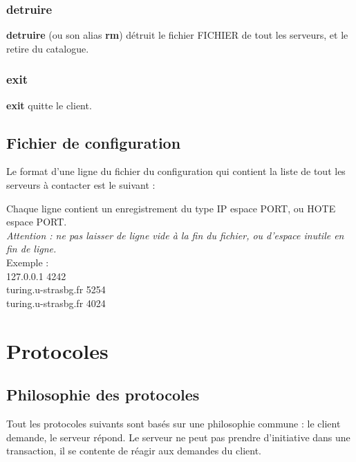 \documentclass[10pt,a4paper]{article}
\begin{document}
\subsubsection{detruire}
\begin{center}
\end{center}
\textbf{detruire} (ou son alias \textbf{rm}) détruit le fichier FICHIER de tout les serveurs, et le retire du catalogue.

\subsubsection{exit}
\begin{center}
\end{center}
\textbf{exit} quitte le client.

\subsection{Fichier de configuration}

Le format d'une ligne du fichier du configuration qui contient la liste de tout les serveurs à contacter est le suivant :
\begin{center}
\end{center}
Chaque ligne contient un enregistrement du type IP espace PORT, ou HOTE espace PORT.\\
\textit{Attention : ne pas laisser de ligne vide à la fin du fichier, ou d'espace inutile en fin de ligne.}\\

Exemple :\\
127.0.0.1 4242\\
turing.u-strasbg.fr 5254\\
turing.u-strasbg.fr 4024\\
\newpage

\section{Protocoles}

\subsection{Philosophie des protocoles}
Tout les protocoles suivants sont basés sur une philosophie commune : le client demande, le serveur répond.
Le serveur ne peut pas prendre d'initiative dans une transaction, il se contente de réagir aux demandes du client.
\end{document}
